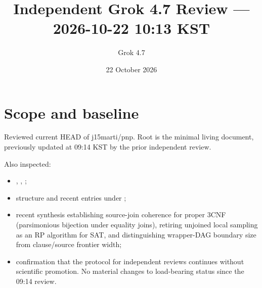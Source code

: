 \documentclass[11pt]{article}
\title{Independent Grok 4.7 Review --- 2026-10-22 10:13 KST}
\author{Grok 4.7}
\date{22 October 2026}
\begin{document}
\maketitle

\begin{center}
\end{center}

\section{Scope and baseline}
Reviewed current HEAD of j15marti/pnp. Root  is the minimal living document, previously updated at 09:14 KST by the prior independent review.

Also inspected:
\begin{itemize}
\item {}, , ;
\item structure and recent entries under ;
\item recent synthesis  establishing source-join coherence for proper 3CNF (parsimonious bijection under equality joins), retiring unjoined local sampling as an RP algorithm for SAT, and distinguishing wrapper-DAG boundary size from clause/source frontier width;
\item confirmation that the protocol for independent reviews continues without scientific promotion. No material changes to load-bearing status since the 09:14 review.
\end{itemize}
\end{document}
